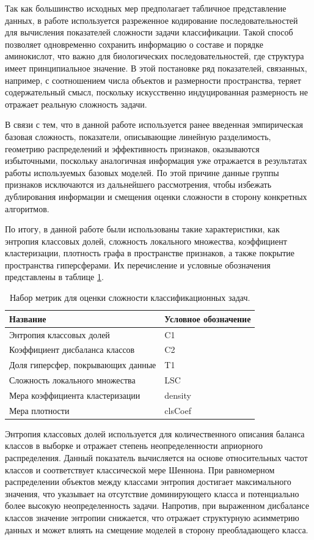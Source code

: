 \documentclass[specification,annotation,times]{itmo-student-thesis}
\begin{document}
Так как большинство исходных мер предполагает табличное представление данных, в работе используется разреженное кодирование последовательностей для вычисления показателей сложности задачи классификации. Такой способ позволяет одновременно сохранить информацию о составе и порядке аминокислот, что важно для биологических последовательностей, где структура имеет принципиальное значение. В этой постановке ряд показателей, связанных, например, с соотношением числа объектов и размерности пространства, теряет содержательный смысл, поскольку искусственно индуцированная размерность не отражает реальную сложность задачи.

В связи с тем, что в данной работе используется ранее введенная эмпирическая базовая сложность, показатели, описывающие линейную разделимость, геометрию распределений и эффективность признаков, оказываются избыточными, поскольку аналогичная информация уже отражается в результатах работы используемых базовых моделей. По этой причине данные группы признаков исключаются из дальнейшего рассмотрения, чтобы избежать дублирования информации и смещения оценки сложности в сторону конкретных алгоритмов.

По итогу, в данной работе были использованы такие характеристики, как энтропия классовых долей, сложность локального множества, коэффициент кластеризации, плотность графа в пространстве признаков, а также покрытие пространства гиперсферами. Их перечисление и условные обозначения представлены в таблице \ref{tab:complexity_metrics}.

\begin{table}[h]
\centering
\begin{tabular}{|l|l|}
\hline
\textbf{Название} & \textbf{Условное обозначение} \\ \hline
Энтропия классовых долей & C1 \\ \hline
Коэффициент дисбаланса классов & C2 \\ \hline
Доля гиперсфер, покрывающих данные & T1 \\ \hline
Сложность локального множества & LSC \\ \hline
Мера коэффициента кластеризации & density \\ \hline
Мера плотности & clsCoef \\ \hline
\end{tabular}
\caption{Набор метрик для оценки сложности классификационных задач.}
\label{tab:complexity_metrics}
\end{table}

Энтропия классовых долей используется для количественного описания баланса классов в выборке и отражает степень неопределенности априорного распределения. Данный показатель вычисляется на основе относительных частот классов и соответствует классической мере Шеннона. При равномерном распределении объектов между классами энтропия достигает максимального значения, что указывает на отсутствие доминирующего класса и потенциально более высокую неопределенность задачи. Напротив, при выраженном дисбалансе классов значение энтропии снижается, что отражает структурную асимметрию данных и может влиять на смещение моделей в сторону преобладающего класса. 
\end{document}
